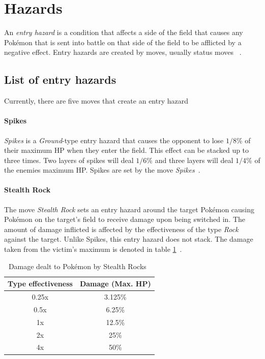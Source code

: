 \section{Hazards}
\label{sec:hazards}
An \textit{entry hazard} is a condition that affects a side of the field that causes
any Pokémon that is sent into battle on that side of the field to be afflicted by 
a negative effect. Entry hazards are created by moves, usually status moves
~\autocite{Bulbapedia:EntryHazards}. \\
\subsection{List of entry hazards}
Currently, there are five moves that create an entry hazard

\paragraph{Spikes}
\textit{Spikes} is a \textit{Ground}-type entry hazard that causes the opponent
to lose $1/8$\% of their maximum \ac{HP} when they enter the field. This
effect can be stacked up to three times. Two layers of spikes will deal
$1/6$\% and three layers will deal $1/4$\% of the enemies maximum \ac{HP}.
Spikes are set by the move \textit{Spikes}~\autocite{Bulbapedia:Spikes}.

\paragraph{Stealth Rock}
\label{sec:stealthrock}
The move \textit{Stealth Rock} sets an entry hazard around the target Pokémon
causing Pokémon on the target's field to receive damage upon being switched in.
The amount of damage inflicted is affected by the effectiveness of the type
\textit{Rock} against the target. Unlike Spikes, this entry hazard does not stack.
The damage taken from the victim's maximum is denoted in table 
\ref{tab:stealth-rock-damage}~\autocite{Bulbapedia:StealthRock}.
\begin{table}[h]
	\centering
	\begin{tabular}{|c|c|}
		\hline
		\textbf{Type effectiveness} & \textbf{Damage (Max. \ac{HP}}) \\
		\hline 
		0.25x & 3.125\% \\ 
		\hline 
		0.5x &  6.25\% \\ 
		\hline 
		1x & 12.5\% \\
		\hline
		2x & 25\% \\
		\hline
		4x & 50\% \\
		\hline
	\end{tabular} 
	\caption{Damage dealt to Pokémon by Stealth Rocks~\autocite{Bulbapedia:StealthRock}}
	\label{tab:stealth-rock-damage}
\end{table}

